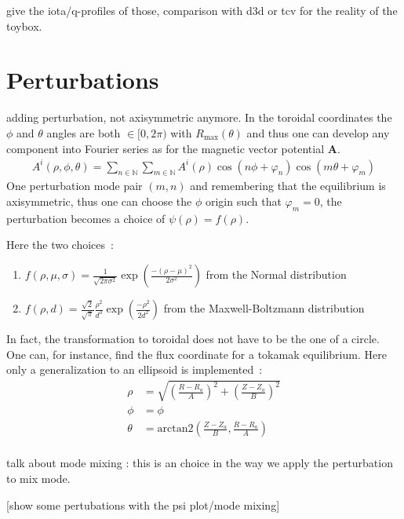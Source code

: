 give the iota/q-profiles of those, comparison with d3d or tcv for the reality of the toybox.

\section{Perturbations}
adding perturbation, not axisymmetric anymore. In the toroidal coordinates the $\phi$ and $\theta$ angles are both $\in [0, 2\pi)$ with $R_\text{max}(\theta)$ and thus one can develop any component into Fourier series as for the magnetic vector potential $\textbf{A}$.
\begin{align*}
    A^i(\rho,\phi,\theta) = \sum\limits_{n\in\mathbb{N}}\sum\limits_{m\in\mathbb{N}} A^i(\rho)\cos(n\phi + \varphi_n)\cos(m\theta + \varphi_m)
\end{align*}
One perturbation mode pair $(m,n)$ and remembering that the equilibrium is axisymmetric, thus one can choose the $\phi$ origin such that $\varphi_m = 0$, the perturbation becomes a choice of $\psi(\rho) = f(\rho)$.

Here the two choices~:

\begin{enumerate}
    \item $f(\rho, \mu, \sigma) = \frac{1}{\sqrt{2\pi\sigma^2}}\exp\left(\frac{-(\rho-\mu)^2}{2\sigma^2}\right)$ from the Normal distribution
    
    \item $f(\rho, d) = \frac{\sqrt{2}}{\sqrt{\pi}}\frac{\rho^2}{d^3}\exp\left(\frac{-\rho^2}{2d^2}\right)$ from the Maxwell-Boltzmann distribution
\end{enumerate}

In fact, the transformation to toroidal does not have to be the one of a circle. One can, for instance, find the flux coordinate for a tokamak equilibrium. Here only a generalization to an ellipsoid is implemented~:
\begin{align*}
    \rho &= \sqrt{\left(\frac{R-R_a}{A}\right)^2 + \left(\frac{Z-Z_a}{B}\right)^2}\\
    \phi &= \phi\\
    \theta &= \text{arctan2}(\frac{Z-Z_a}{B}, \frac{R-R_a}{A})\\
\end{align*}

talk about mode mixing : this is an choice in the way we apply the perturbation to mix mode.

[show some pertubations with the psi plot/mode mixing]

